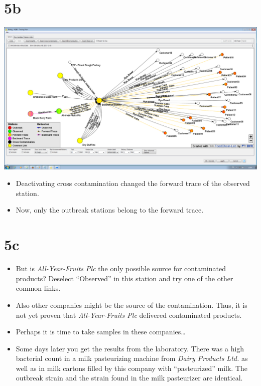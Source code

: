 \documentclass[10pt]{beamer}
\begin{document}
\section{5b}
\begin{frame}
	\begin{center}
  		\includegraphics[height=0.6\textheight]{5b.png}
	\end{center}
	\begin{itemize}
		\item Deactivating cross contamination changed the forward trace of the observed station.
		\item Now, only the outbreak stations belong to the forward trace.
	\end{itemize}
\end{frame}

\section{5c}
\begin{frame}
	\begin{itemize}
		\item But is \textit{All-Year-Fruits Plc} the only possible source for contaminated products? Deselect “Observed” in this station and try one of the other common links.
		\item Also other companies might be the source of the contamination. Thus, it is not yet proven that \textit{All-Year-Fruits Plc} delivered contaminated products.
		\item Perhaps it is time to take samples in these companies…
		\item Some days later you get the results from the laboratory. There was a high bacterial count in a milk pasteurizing machine from \textit{Dairy Products Ltd.} as well as in milk cartons filled by this company with “pasteurized” milk. The outbreak strain and the strain found in the milk pasteurizer are identical.
	\end{itemize}
\end{frame}
\end{document}
